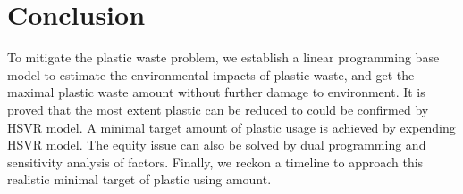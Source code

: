 \documentclass{mcmthesis}
\begin{document}
\section{Conclusion}

To mitigate the plastic waste problem, we establish a linear programming base model to estimate the environmental impacts of plastic waste, and get the maximal plastic waste amount without further damage to environment. It is proved that the most extent plastic can be reduced to could be confirmed by HSVR model. A minimal target amount of plastic usage is achieved by expending HSVR model. The equity issue can also be solved by dual programming and sensitivity analysis of factors. Finally, we reckon a timeline to approach this realistic minimal target of plastic using amount. 

\newpage
\end{document}
